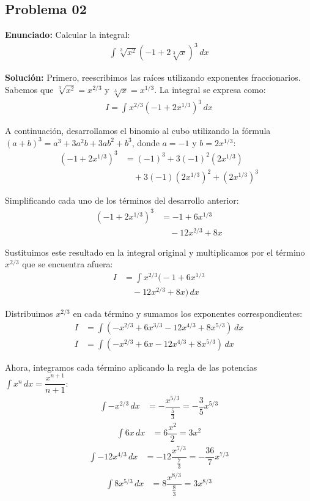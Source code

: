 \subsection*{Problema 02}

\textbf{Enunciado:} Calcular la integral:
\begin{align*}
\int \sqrt[3]{x^2} \left(-1 + 2\sqrt[3]{x}\right)^3 \, dx
\end{align*}

\textbf{Solución:} 
Primero, reescribimos las raíces utilizando exponentes fraccionarios. Sabemos que $\sqrt[3]{x^2} = x^{2/3}$ y $\sqrt[3]{x} = x^{1/3}$. La integral se expresa como:
\begin{align*}
I = \int x^{2/3} \left(-1 + 2x^{1/3}\right)^3 \, dx
\end{align*}

A continuación, desarrollamos el binomio al cubo utilizando la fórmula $(a + b)^3 = a^3 + 3a^2b + 3ab^2 + b^3$, donde $a = -1$ y $b = 2x^{1/3}$:
\begin{align*}
\left(-1 + 2x^{1/3}\right)^3 &= (-1)^3 + 3(-1)^2(2x^{1/3}) \\
&\quad + 3(-1)(2x^{1/3})^2 + (2x^{1/3})^3
\end{align*}

Simplificando cada uno de los términos del desarrollo anterior:
\begin{align*}
\left(-1 + 2x^{1/3}\right)^3 &= -1 + 6x^{1/3} \\
&\quad - 12x^{2/3} + 8x
\end{align*}

Sustituimos este resultado en la integral original y multiplicamos por el término $x^{2/3}$ que se encuentra afuera:
\begin{align*}
I &= \int x^{2/3} \Big(-1 + 6x^{1/3} \\
&\quad - 12x^{2/3} + 8x \Big) \, dx
\end{align*}

Distribuimos $x^{2/3}$ en cada término y sumamos los exponentes correspondientes:
\begin{align*}
I &= \int \left( -x^{2/3} + 6x^{3/3} - 12x^{4/3} + 8x^{5/3} \right) \, dx \\
I &= \int \left( -x^{2/3} + 6x - 12x^{4/3} + 8x^{5/3} \right) \, dx
\end{align*}

Ahora, integramos cada término aplicando la regla de las potencias $\int x^n \, dx = \dfrac{x^{n+1}}{n+1}$:
\begin{align*}
\int -x^{2/3} \, dx &= -\dfrac{x^{5/3}}{\frac{5}{3}} = -\dfrac{3}{5}x^{5/3}
\end{align*}
\begin{align*}
\int 6x \, dx &= 6\dfrac{x^2}{2} = 3x^2
\end{align*}
\begin{align*}
\int -12x^{4/3} \, dx &= -12\dfrac{x^{7/3}}{\frac{7}{3}} = -\dfrac{36}{7}x^{7/3}
\end{align*}
\begin{align*}
\int 8x^{5/3} \, dx &= 8\dfrac{x^{8/3}}{\frac{8}{3}} = 3x^{8/3}
\end{align*}

